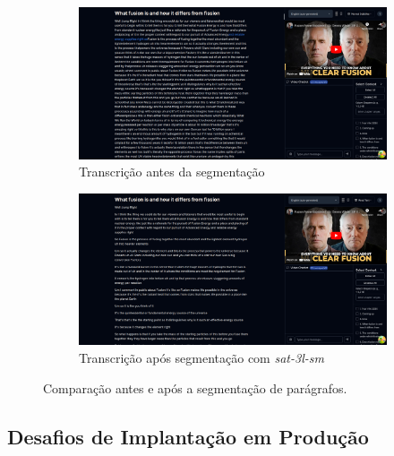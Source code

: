 \documentclass[tcc,capa]{texufpel}
\begin{document}
\begin{figure}[H]
  \centering
  \begin{subfigure}{\textwidth}
      \centering
      \includegraphics[width=\textwidth,height=0.45\textheight,keepaspectratio]{exemplo-slides/graphics/images/pre-improved-readability.png}
      \caption{Transcrição antes da segmentação}
      \label{fig:pre-improved-readability}
  \end{subfigure}
  
  \begin{subfigure}{\textwidth}
      \centering
      \includegraphics[width=\textwidth,height=0.45\textheight,keepaspectratio]{exemplo-slides/graphics/images/after-improved-readability.png}
      \caption{Transcrição após segmentação com \textit{sat-3l-sm}}
      \label{fig:after-improved-readability}
  \end{subfigure}
  \caption{Comparação antes e após a segmentação de parágrafos.}
  \label{fig:readability-comparison}
\end{figure}






\subsection{Desafios de Implantação em Produção}
\end{document}
